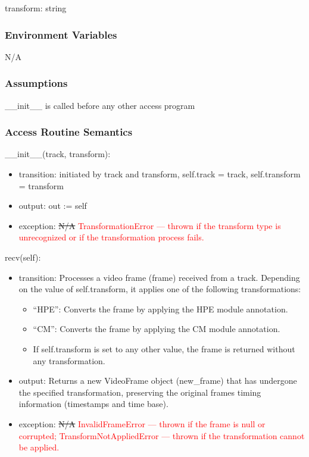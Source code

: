 \documentclass[12pt, titlepage]{article}
\newcommand{\rt}[1]{\textcolor{red}{#1}}
\begin{document}
transform: string

\subsubsection{Environment Variables}
N/A

\subsubsection{Assumptions}
\_\_init\_\_ is called before any other access program

\subsubsection{Access Routine Semantics}

\noindent \_\_init\_\_(track, transform):
\begin{itemize}
  \item transition: initiated by track and transform, self.track = track, self.transform = transform
  \item output: out := self
  \item exception: \sout{N/A} \rt{TransformationError --- thrown if the transform type is unrecognized or if the transformation process fails.}
\end{itemize}

\noindent recv(self):
\begin{itemize}
\item transition: Processes a video frame (frame) received from a track. Depending
  on the value of self.transform, it applies one of the following
  transformations:
  \begin{itemize}
  \item ``HPE'': Converts the frame by applying the HPE module
    annotation.
  \item ``CM'': Converts the frame by applying the CM module annotation.
  \item If self.transform is set to any other value, the frame is returned without any
    transformation.
  \end{itemize}
\item output: Returns a new VideoFrame object (new\_frame) that has undergone the
  specified transformation, preserving the original frames timing information
  (timestamps and time base).
  \item exception: \sout{N/A} \rt{InvalidFrameError --- thrown if the frame is null or corrupted; TransformNotAppliedError --- thrown if the transformation cannot be applied.}
\end{itemize}
\end{document}
